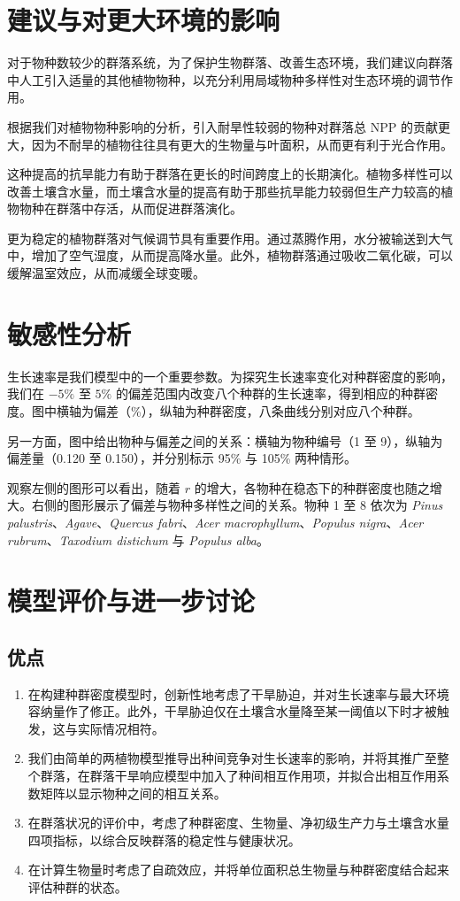 \documentclass[11pt,a4paper]{ctexart}
\begin{document}
\section{建议与对更大环境的影响}

对于物种数较少的群落系统，为了保护生物群落、改善生态环境，我们建议向群落中人工引入适量的其他植物物种，以充分利用局域物种多样性对生态环境的调节作用。

根据我们对植物物种影响的分析，引入耐旱性较弱的物种对群落总 NPP 的贡献更大，因为不耐旱的植物往往具有更大的生物量与叶面积，从而更有利于光合作用。

这种提高的抗旱能力有助于群落在更长的时间跨度上的长期演化。植物多样性可以改善土壤含水量，而土壤含水量的提高有助于那些抗旱能力较弱但生产力较高的植物物种在群落中存活，从而促进群落演化。

更为稳定的植物群落对气候调节具有重要作用。通过蒸腾作用，水分被输送到大气中，增加了空气湿度，从而提高降水量。此外，植物群落通过吸收二氧化碳，可以缓解温室效应，从而减缓全球变暖。

\section{敏感性分析}

生长速率是我们模型中的一个重要参数。为探究生长速率变化对种群密度的影响，我们在 $-5\%$ 至 $5\%$ 的偏差范围内改变八个种群的生长速率，得到相应的种群密度。图中横轴为偏差（\%），纵轴为种群密度，八条曲线分别对应八个种群。

另一方面，图中给出物种与偏差之间的关系：横轴为物种编号（1 至 9），纵轴为偏差量（0.120 至 0.150），并分别标示 95\% 与 105\% 两种情形。

观察左侧的图形可以看出，随着 $r$ 的增大，各物种在稳态下的种群密度也随之增大。右侧的图形展示了偏差与物种多样性之间的关系。物种 1 至 8 依次为 \textit{Pinus palustris}、\textit{Agave}、\textit{Quercus fabri}、\textit{Acer macrophyllum}、\textit{Populus nigra}、\textit{Acer rubrum}、\textit{Taxodium distichum} 与 \textit{Populus alba}。

\section{模型评价与进一步讨论}

\subsection{优点}

\begin{enumerate}
\item 在构建种群密度模型时，创新性地考虑了干旱胁迫，并对生长速率与最大环境容纳量作了修正。此外，干旱胁迫仅在土壤含水量降至某一阈值以下时才被触发，这与实际情况相符。
\item 我们由简单的两植物模型推导出种间竞争对生长速率的影响，并将其推广至整个群落，在群落干旱响应模型中加入了种间相互作用项，并拟合出相互作用系数矩阵以显示物种之间的相互关系。
\item 在群落状况的评价中，考虑了种群密度、生物量、净初级生产力与土壤含水量四项指标，以综合反映群落的稳定性与健康状况。
\item 在计算生物量时考虑了自疏效应，并将单位面积总生物量与种群密度结合起来评估种群的状态。
\end{enumerate}
\end{document}
